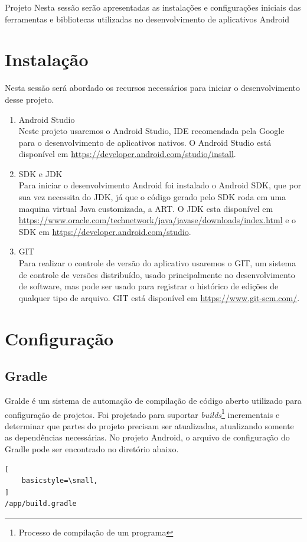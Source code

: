 \documentclass[
	12pt,				%
	openright,			%
	twoside,			%
	a4paper,			%
	english,			%
	french,				%
	spanish,			%
	brazil				%
	]{abntex2}
\begin{document}
\begin{chapter}{Projeto}
Nesta sessão serão apresentadas as instalações e configurações iniciais das ferramentas e bibliotecas utilizadas no desenvolvimento de aplicativos Android
\section{Instalação}
Nesta sessão será abordado os  recursos necessários para iniciar o desenvolvimento desse projeto.
\begin{enumerate}
  \item{Android Studio} \\
  Neste projeto usaremos o Android Studio, IDE recomendada pela Google para o desenvolvimento de aplicativos nativos. O Android Studio está disponível em \url{https://developer.android.com/studio/install}.
  \item{SDK e JDK} \\ Para iniciar o desenvolvimento Android foi instalado o Android SDK, que por sua vez necessita do JDK, já que o código gerado pelo SDK roda em uma maquina virtual Java customizada, a ART.
  O JDK esta disponível em \url{https://www.oracle.com/technetwork/java/javase/downloads/index.html} e o SDK em \url{https://developer.android.com/studio}.
  \item{GIT} \\
  Para realizar o controle de versão do aplicativo usaremos o GIT, um sistema de controle de versões distribuído, usado principalmente no desenvolvimento de software, mas pode ser usado para registrar o histórico de edições de qualquer tipo de arquivo. 
  GIT está disponível em \url{https://www.git-scm.com/}.
  
\end{enumerate}






\section{Configuração}
\subsection{Gradle}
Gralde é um sistema de automação de compilação de código aberto utilizado para configuração de projetos. Foi projetado para suportar \textit{builds}\footnote{Processo de compilação de um programa} incrementais e determinar que partes do projeto precisam ser atualizadas, atualizando somente as dependências necessárias.
No projeto Android, o arquivo de configuração do Gradle pode ser encontrado no diretório abaixo. \begin{lstlisting}[
    basicstyle=\small,
]
/app/build.gradle
\end{lstlisting}

\end{chapter}
\end{document}
